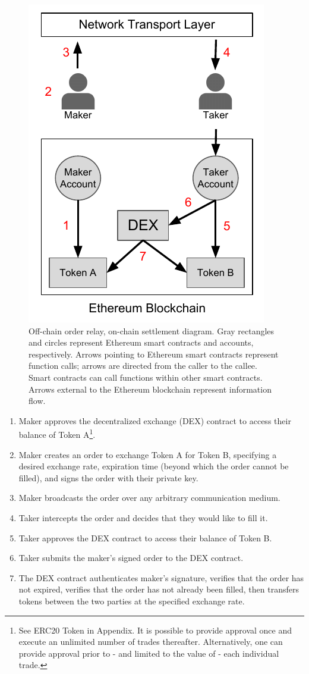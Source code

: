 \documentclass[10pt]{article}
\begin{document}
\begin{figure}[h]
    \centering
    \includegraphics[width=0.4\linewidth]{../figures/fig2.pdf}
    \caption{Off-chain order relay, on-chain settlement diagram. Gray rectangles and circles represent Ethereum smart contracts and accounts, respectively. Arrows pointing to Ethereum smart contracts represent function calls; arrows are directed from the caller to the callee. Smart contracts can call functions within other smart contracts. Arrows external to the Ethereum blockchain represent information flow.  }
    \label{fig:fig2}
\end{figure}

\begin{enumerate}[noitemsep]
\item Maker approves the decentralized exchange (DEX) contract to access their balance of Token A\footnote{ See ERC20 Token in Appendix. It is possible to provide approval once and execute an unlimited number of trades thereafter. Alternatively, one can provide approval prior to - and limited to the value of - each individual trade.}.
\item Maker creates an order to exchange Token A for Token B, specifying a desired exchange rate, expiration time (beyond which the order cannot be filled), and signs the order with their private key.
\item Maker broadcasts the order over any arbitrary communication medium.
\item Taker intercepts the order and decides that they would like to fill it.
\item Taker approves the DEX contract to access their balance of Token B.
\item Taker submits the maker’s signed order to the DEX contract.
\item The DEX contract authenticates maker’s signature, verifies that the order has not expired, verifies that the order has not already been filled, then transfers tokens between the two parties at the specified exchange rate.
\end{enumerate}
\end{document}
